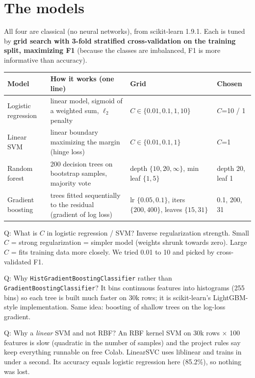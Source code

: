 \documentclass[11pt,a4paper]{article}
\begin{document}
\section{The models}

All four are classical (no neural networks), from scikit-learn 1.9.1. Each is tuned by \textbf{grid search with 3-fold stratified cross-validation on the training split, maximizing F1} (because the classes are imbalanced, F1 is more informative than accuracy).

\begin{center}\footnotesize
\begin{tabular}{p{2.3cm}p{5.2cm}p{4.3cm}p{2.2cm}}
\toprule
Model & How it works (one line) & Grid & Chosen \\
\midrule
Logistic regression & linear model, sigmoid of a weighted sum, $\ell_2$ penalty & $C\in\{0.01,0.1,1,10\}$ & $C$=10 / 1 \\
Linear SVM & linear boundary maximizing the margin (hinge loss) & $C\in\{0.01,0.1,1\}$ & $C$=1 \\
Random forest & 200 decision trees on bootstrap samples, majority vote & depth $\{10,20,\infty\}$, min leaf $\{1,5\}$ & depth 20, leaf 1 \\
Gradient boosting & trees fitted sequentially to the residual (gradient of log loss) & lr $\{0.05,0.1\}$, iters $\{200,400\}$, leaves $\{15,31\}$ & 0.1, 200, 31 \\
\bottomrule
\end{tabular}
\end{center}

\begin{qa}{Q: What is $C$ in logistic regression / SVM?}
Inverse regularization strength. Small $C$ = strong regularization = simpler model (weights shrunk towards zero). Large $C$ = fits training data more closely. We tried 0.01 to 10 and picked by cross-validated F1.
\end{qa}

\begin{qa}{Q: Why \texttt{HistGradientBoostingClassifier} rather than \texttt{GradientBoostingClassifier}?}
It bins continuous features into histograms (255 bins) so each tree is built much faster on 30k rows; it is scikit-learn's LightGBM-style implementation. Same idea: boosting of shallow trees on the log-loss gradient.
\end{qa}

\begin{qa}{Q: Why a \emph{linear} SVM and not RBF?}
An RBF kernel SVM on 30k rows $\times$ 100 features is slow (quadratic in the number of samples) and the project rules say keep everything runnable on free Colab. LinearSVC uses liblinear and trains in under a second. Its accuracy equals logistic regression here (85.2\%), so nothing was lost.
\end{qa}
\end{document}
